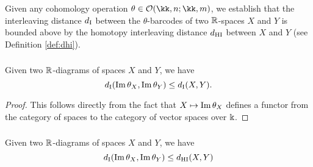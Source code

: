 Given any cohomology operation $\theta \in \cO(\kk, n; \kk, m)$, we establish that the interleaving distance $d_{\mathrm{I}}$ between the $\theta$-barcodes of two $\mathbb{R}$-spaces $X$ and $Y$ is bounded above by the homotopy interleaving distance $d_{\mathrm{HI}}$ between $X$ and $Y$ (see Definition \ref{def:dhi}).


\subsubsection{}\label{lem:di stability}

\lemma Given two $\mathbb{R}$-diagrams of spaces $X$ and $Y$, we have
\[
d_{\mathrm{I}}(\operatorname{Im}\theta_{X}, \operatorname{Im}\theta_{Y}) \leq d_{\mathrm{I}}(X,Y).
\]

\begin{proof}
	This follows directly from the fact that $X \mapsto \operatorname{Im}\theta_{X}$ defines a functor from the category of spaces to the category of vector spaces over $\Bbbk$.
\end{proof}

\subsubsection{}\label{thm:theta stability}

\theorem Given two $\mathbb{R}$-diagrams of spaces $X$ and $Y$, we have
\begin{equation}\label{eq:theta di-stability}
	d_{\mathrm{I}}(\operatorname{Im}\theta_{X}, \operatorname{Im}\theta_{Y})\leq d_{\mathrm{HI}}(X,Y)
\end{equation}

